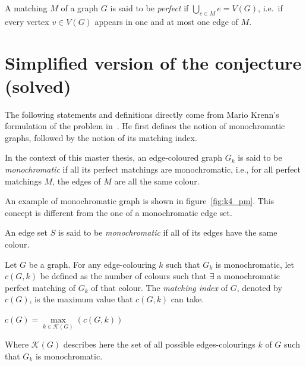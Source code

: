 \begin{definition}
    \label{def:perfect_matching}
    A matching $M$ of a graph $G$ is said to be \textit{perfect} if $\bigcup\limits_{e \in M} e = V(G)$, i.e.\ if every vertex $v \in V(G)$ appears in one and at most one edge of $M$.
\end{definition}


\section{Simplified version of the conjecture (solved)}
\label{sec:simplified-version-of-the-conjecture}

The following statements and definitions directly come from Mario Krenn's formulation of the problem in~\cite{wordpress}.
He first defines the notion of monochromatic graphs, followed by the notion of its matching index.

\begin{definition}
    \label{def:monochromatic_graph}
    In the context of this master thesis, an edge-coloured graph $G_k$ is said to be \textit{monochromatic} if all its perfect matchings are monochromatic, i.e., for all perfect matchings $M$, the edges of $M$ are all the same colour.
\end{definition}

An example of monochromatic graph is shown in figure~\ref{fig:k4_pm}.
This concept is different from the one of a monochromatic edge set.

\begin{definition}
    \label{def:monochromatic_edge_set}
    An edge set $S$ is said to be \textit{monochromatic} if all of its edges have the same colour.
\end{definition}

\begin{definition}
    \label{def:matching_index}
    Let $G$ be a graph.
    For any edge-colouring $k$ such that $G_k$ is monochromatic, let $c(G, k)$ be defined as the number of colours such that $\exists$ a monochromatic perfect matching of $G_k$ of that colour.
    The \textit{matching index} of $G$, denoted by $c(G)$, is the maximum value that $c(G, k)$ can take.
    \begin{center}
        $c(G) = \max\limits_{k \in \mathcal{K}(G)}(c(G, k))$
    \end{center}
    Where $\mathcal{K}(G)$ describes here the set of all possible edges-colourings $k$ of $G$ such that $G_{k}$ is monochromatic.
\end{definition}

